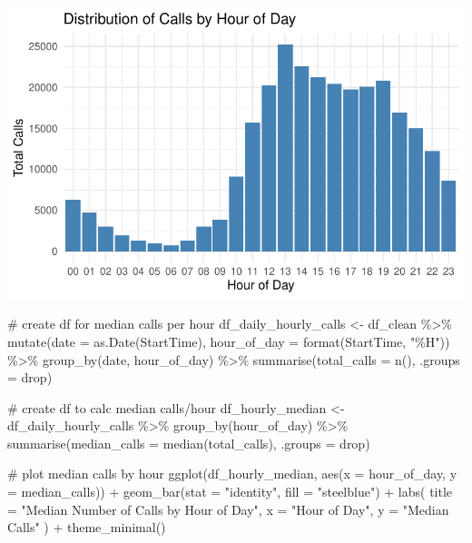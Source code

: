 \documentclass[
  letterpaper,
  DIV=11,
  numbers=noendperiod]{scrartcl}
\newenvironment{Shaded}{\begin{snugshade}}{\end{snugshade}}
\newcommand{\AttributeTok}[1]{\textcolor[rgb]{0.40,0.45,0.13}{#1}}
\newcommand{\CommentTok}[1]{\textcolor[rgb]{0.37,0.37,0.37}{#1}}
\newcommand{\FunctionTok}[1]{\textcolor[rgb]{0.28,0.35,0.67}{#1}}
\newcommand{\NormalTok}[1]{\textcolor[rgb]{0.00,0.23,0.31}{#1}}
\newcommand{\OtherTok}[1]{\textcolor[rgb]{0.00,0.23,0.31}{#1}}
\newcommand{\SpecialCharTok}[1]{\textcolor[rgb]{0.37,0.37,0.37}{#1}}
\newcommand{\StringTok}[1]{\textcolor[rgb]{0.13,0.47,0.30}{#1}}
\begin{document}
\includegraphics{final_proj_group1_files/figure-pdf/hour_of_day-1.pdf}

\begin{Shaded}
\begin{Highlighting}[]
\CommentTok{\# create df for median calls per hour}
\NormalTok{df\_daily\_hourly\_calls }\OtherTok{\textless{}{-}}\NormalTok{ df\_clean }\SpecialCharTok{\%\textgreater{}\%}
  \FunctionTok{mutate}\NormalTok{(}\AttributeTok{date =} \FunctionTok{as.Date}\NormalTok{(StartTime), }
         \AttributeTok{hour\_of\_day =} \FunctionTok{format}\NormalTok{(StartTime, }\StringTok{"\%H"}\NormalTok{)) }\SpecialCharTok{\%\textgreater{}\%}
  \FunctionTok{group\_by}\NormalTok{(date, hour\_of\_day) }\SpecialCharTok{\%\textgreater{}\%}
  \FunctionTok{summarise}\NormalTok{(}\AttributeTok{total\_calls =} \FunctionTok{n}\NormalTok{(), }\AttributeTok{.groups =} \StringTok{\textquotesingle{}drop\textquotesingle{}}\NormalTok{)}

\CommentTok{\# create df to calc median calls/hour}
\NormalTok{df\_hourly\_median }\OtherTok{\textless{}{-}}\NormalTok{ df\_daily\_hourly\_calls }\SpecialCharTok{\%\textgreater{}\%}
  \FunctionTok{group\_by}\NormalTok{(hour\_of\_day) }\SpecialCharTok{\%\textgreater{}\%}
  \FunctionTok{summarise}\NormalTok{(}\AttributeTok{median\_calls =} \FunctionTok{median}\NormalTok{(total\_calls), }\AttributeTok{.groups =} \StringTok{\textquotesingle{}drop\textquotesingle{}}\NormalTok{)}

\CommentTok{\# plot median calls by hour}
\FunctionTok{ggplot}\NormalTok{(df\_hourly\_median, }\FunctionTok{aes}\NormalTok{(}\AttributeTok{x =}\NormalTok{ hour\_of\_day, }\AttributeTok{y =}\NormalTok{ median\_calls)) }\SpecialCharTok{+} 
  \FunctionTok{geom\_bar}\NormalTok{(}\AttributeTok{stat =} \StringTok{"identity"}\NormalTok{, }\AttributeTok{fill =} \StringTok{"steelblue"}\NormalTok{) }\SpecialCharTok{+}
  \FunctionTok{labs}\NormalTok{(}
    \AttributeTok{title =} \StringTok{"Median Number of Calls by Hour of Day"}\NormalTok{, }
    \AttributeTok{x =} \StringTok{"Hour of Day"}\NormalTok{, }
    \AttributeTok{y =} \StringTok{"Median Calls"}
\NormalTok{  ) }\SpecialCharTok{+} 
  \FunctionTok{theme\_minimal}\NormalTok{()}
\end{Highlighting}
\end{Shaded}
\end{document}
